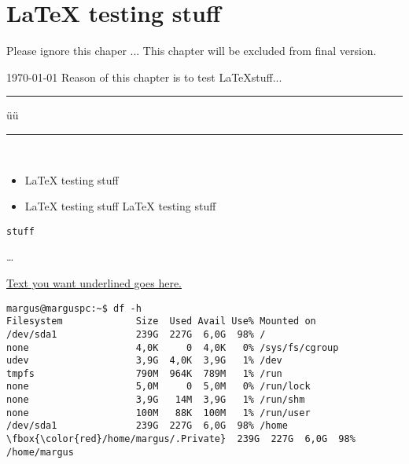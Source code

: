 \chapter{LaTeX testing stuff}
\label{LaTeX testing stuff}
{\color{red} 
{\huge Please ignore this chaper ...
This chapter will be excluded from final version.}
}



{\huge\today}
Reason of this chapter is to test \LaTeX  stuff...
\rule{2.6cm}{0.75pt}  \hspace{3cm} üü \rule{3cm}{0.75pt}\\[2cm]
\begin{itemize}
	\item LaTeX testing stuff
	\item LaTeX testing stuff LaTeX testing stuff
\end{itemize}
\begin{Verbatim}[frame=single]
stuff
\end{Verbatim}

\ldots
{}


\underline{Text you want underlined goes here.}




\begin{Verbatim}[frame=single,
label=Command output,framesep=2mm,rulecolor=\color{red},commandchars=\\\{\}]
margus@marguspc:~$ df -h
Filesystem             Size  Used Avail Use% Mounted on
/dev/sda1              239G  227G  6,0G  98% /
none                   4,0K     0  4,0K   0% /sys/fs/cgroup
udev                   3,9G  4,0K  3,9G   1% /dev
tmpfs                  790M  964K  789M   1% /run
none                   5,0M     0  5,0M   0% /run/lock
none                   3,9G   14M  3,9G   1% /run/shm
none                   100M   88K  100M   1% /run/user
/dev/sda1              239G  227G  6,0G  98% /home
\fbox{\color{red}/home/margus/.Private}  239G  227G  6,0G  98% /home/margus
\end{Verbatim}



